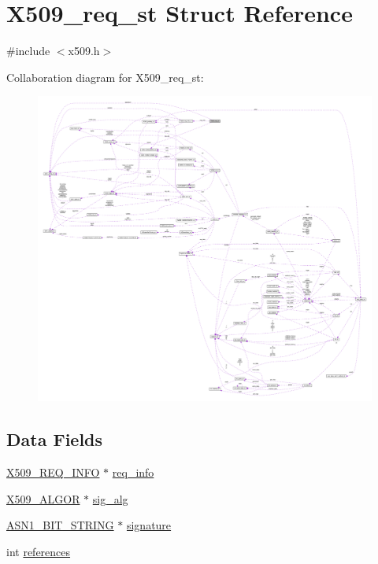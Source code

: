 \hypertarget{struct_x509__req__st}{}\section{X509\+\_\+req\+\_\+st Struct Reference}
\label{struct_x509__req__st}


{\ttfamily \#include $<$x509.\+h$>$}



Collaboration diagram for X509\+\_\+req\+\_\+st\+:\nopagebreak
\begin{figure}[H]
\begin{center}
\leavevmode
\includegraphics[width=350pt]{struct_x509__req__st__coll__graph}
\end{center}
\end{figure}
\subsection*{Data Fields}
\begin{DoxyCompactItemize}
\item 
\hyperlink{crypto_2x509_2x509_8h_a69f978223ac282eaa2b2740ef6684d96}{X509\+\_\+\+R\+E\+Q\+\_\+\+I\+N\+FO} $\ast$ \hyperlink{struct_x509__req__st_af4f0321a73b22bed3bfc40e3ac294556}{req\+\_\+info}
\item 
\hyperlink{crypto_2ossl__typ_8h_aa2b6185e6254f36f709cd6577fb5022e}{X509\+\_\+\+A\+L\+G\+OR} $\ast$ \hyperlink{struct_x509__req__st_a48635ef8176d7ad1ab56a1088f7321fb}{sig\+\_\+alg}
\item 
\hyperlink{crypto_2ossl__typ_8h_af837aaa00e151b1e8773aea5a8fe1cc4}{A\+S\+N1\+\_\+\+B\+I\+T\+\_\+\+S\+T\+R\+I\+NG} $\ast$ \hyperlink{struct_x509__req__st_a0ded22400c40848a864a98aeb7946f1a}{signature}
\item 
int \hyperlink{struct_x509__req__st_a146fdb34d9a909e530adf8b189481195}{references}
\end{DoxyCompactItemize}


